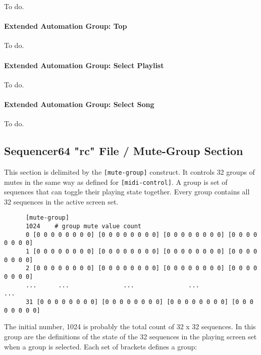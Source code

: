    To do.

\paragraph{Extended Automation Group: Top}
\label{paragraph:seq64_rc_file_midi_ctrl_ex_top}

   To do.

\paragraph{Extended Automation Group: Select Playlist}
\label{paragraph:seq64_rc_file_midi_ctrl_ex_sellist}

   To do.

\paragraph{Extended Automation Group: Select Song}
\label{paragraph:seq64_rc_file_midi_ctrl_ex_selsong}

   To do.

\subsection{Sequencer64 "rc" File / Mute-Group Section}
\label{subsec:seq64_rc_file_mute_group}
     
   This section is delimited by the \texttt{[mute-group]} construct.
   It controls 32 groups of mutes in the same way as defined for
   \texttt{[midi-control]}. A group is set of sequences that can toggle their
   playing state together.  Every group contains all 32 sequences in the
   active screen set.

   \begin{verbatim}
      [mute-group]
      1024    # group mute value count
      0 [0 0 0 0 0 0 0 0] [0 0 0 0 0 0 0 0] [0 0 0 0 0 0 0 0] [0 0 0 0 0 0 0 0]
      1 [0 0 0 0 0 0 0 0] [0 0 0 0 0 0 0 0] [0 0 0 0 0 0 0 0] [0 0 0 0 0 0 0 0]
      2 [0 0 0 0 0 0 0 0] [0 0 0 0 0 0 0 0] [0 0 0 0 0 0 0 0] [0 0 0 0 0 0 0 0]
      ...      ...               ...               ...               ...
      31 [0 0 0 0 0 0 0 0] [0 0 0 0 0 0 0 0] [0 0 0 0 0 0 0 0] [0 0 0 0 0 0 0 0]
   \end{verbatim}

   The initial number, 1024 is probably the total count of 32 x 32 sequences.
   In this group are the definitions of the state of the 32 sequences
   in the playing screen set when a group is selected.
   Each set of brackets defines a group:
   
